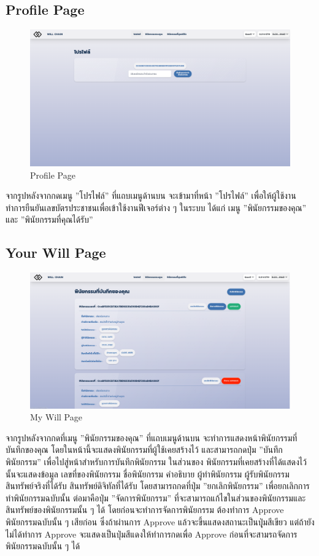 \documentclass[12pt,oneside,openright,a4paper]{cpe-thai-project}
\begin{document}
\clearpage
\subsection{Profile Page}
	\begin{figure}[!thb]
			\centering
			\includegraphics[scale=0.2]{Profile4}
			\caption{Profile Page}
		\end{figure}
		\FloatBarrier
\tab จากรูปหลังจากกดเมนู ''โปรไฟล์'' ที่แถบเมนูด้านบน จะเข้ามาที่หน้า ''โปรไฟล์'' เพื่อให้ผู้ใช้งานทำการยืนยันเลขบัตรประชาชนเพื่อเข้าใช้งานฟีเจอร์ต่าง ๆ ในระบบ ได้แก่ เมนู ''พินัยกรรมของคุณ'' และ ''พินัยกรรมที่คุณได้รับ''
\subsection{Your Will Page }
	\begin{figure}[!thb]
			\centering
			\includegraphics[scale=0.2]{myWill4}
			\caption{My Will Page}
		\end{figure}
		\FloatBarrier
\tab จากรูปหลังจากกดที่เมนู ''พินัยกรรมของคุณ'' ที่แถบเมนูด้านบน จะทำการแสดงหน้าพินัยกรรมที่บันทึกของคุณ โดยในหน้านี้จะแสดงพินัยกรรมที่ผู้ใช้เคยสร้างไว้ และสามารถกดปุ่ม ''บันทึกพินัยกรรม'' เพื่อไปสู่หน้าสำหรับการบันทึกพินัยกรรม ในส่วนของ
พินัยกรรมที่เคยสร้างที่ได้แสดงไว้นั้นจะแสดงข้อมูล เลขที่ของพินัยกรรม ชื่อพินัยกรรม คำอธิบาย ผู้ทำพินัยกรรม ผู้รับพินัยกรรม สินทรัพย์จริงที่ได้รับ สินทรัพย์ดิจิทัลที่ได้รับ โดยสามารถกดที่ปุ่ม ''ยกเลิกพินัยกรรม'' เพื่อยกเลิกการทำพินัยกรรมฉบับนั้น ต่อมาคือปุ่ม ''จัดการพินัยกรรม'' ที่จะสามารถแก้ไขในส่วนของพินัยกรรมและสินทรัพย์ของพินัยกรรมนั้น ๆ ได้ โดยก่อนจะทำการจัดการพินัยกรรม ต้องทำการ Approve พินัยกรรมฉบับนั้น ๆ เสียก่อน ซึ่งถ้าผ่านการ Approve แล้วจะขึ้นแสดงสถานะเป็นปุุ่มสีเขียว แต่ถ้ายังไม่ได้ทำการ Approve จะแสดงเป็นปุ่มสีแดงให้ทำการกดเพื่อ Approve ก่อนที่จะสามรถจัดการพินัยกรรมฉบับนั้น ๆ  ได้
\end{document}
